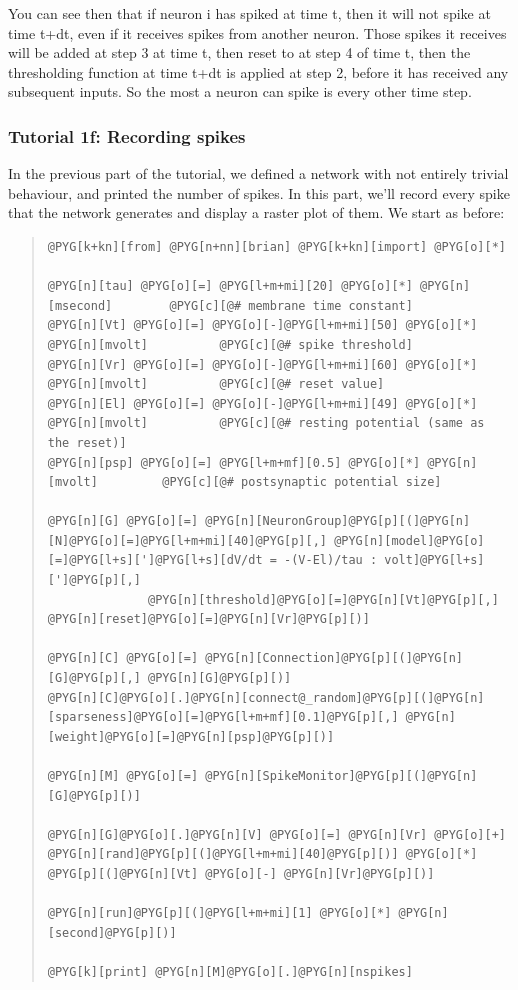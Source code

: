 \documentclass[letterpaper,10pt,english]{manual}
\begin{document}
You can see then that if neuron i has spiked at time t, then it
will not spike at time t+dt, even if it receives spikes from
another neuron. Those spikes it receives will be added at step
3 at time t, then reset to  at step 4 of time t, then the
thresholding function at time t+dt is applied at step 2, before
it has received any subsequent inputs. So the most a neuron
can spike is every other time step.

\resetcurrentobjects
\hypertarget{--doc-tutorial_1f_recording_spikes}{}

\subsubsection{Tutorial 1f: Recording spikes}

In the previous part of the tutorial, we defined a network with
not entirely trivial behaviour, and printed the number of spikes.
In this part, we'll record every spike that the network generates
and display a raster plot of them. We start as before:
\begin{quote}

\begin{Verbatim}[commandchars=@\[\]]
@PYG[k+kn][from] @PYG[n+nn][brian] @PYG[k+kn][import] @PYG[o][*]

@PYG[n][tau] @PYG[o][=] @PYG[l+m+mi][20] @PYG[o][*] @PYG[n][msecond]        @PYG[c][@# membrane time constant]
@PYG[n][Vt] @PYG[o][=] @PYG[o][-]@PYG[l+m+mi][50] @PYG[o][*] @PYG[n][mvolt]          @PYG[c][@# spike threshold]
@PYG[n][Vr] @PYG[o][=] @PYG[o][-]@PYG[l+m+mi][60] @PYG[o][*] @PYG[n][mvolt]          @PYG[c][@# reset value]
@PYG[n][El] @PYG[o][=] @PYG[o][-]@PYG[l+m+mi][49] @PYG[o][*] @PYG[n][mvolt]          @PYG[c][@# resting potential (same as the reset)]
@PYG[n][psp] @PYG[o][=] @PYG[l+m+mf][0.5] @PYG[o][*] @PYG[n][mvolt]         @PYG[c][@# postsynaptic potential size]

@PYG[n][G] @PYG[o][=] @PYG[n][NeuronGroup]@PYG[p][(]@PYG[n][N]@PYG[o][=]@PYG[l+m+mi][40]@PYG[p][,] @PYG[n][model]@PYG[o][=]@PYG[l+s][']@PYG[l+s][dV/dt = -(V-El)/tau : volt]@PYG[l+s][']@PYG[p][,]
              @PYG[n][threshold]@PYG[o][=]@PYG[n][Vt]@PYG[p][,] @PYG[n][reset]@PYG[o][=]@PYG[n][Vr]@PYG[p][)]

@PYG[n][C] @PYG[o][=] @PYG[n][Connection]@PYG[p][(]@PYG[n][G]@PYG[p][,] @PYG[n][G]@PYG[p][)]
@PYG[n][C]@PYG[o][.]@PYG[n][connect@_random]@PYG[p][(]@PYG[n][sparseness]@PYG[o][=]@PYG[l+m+mf][0.1]@PYG[p][,] @PYG[n][weight]@PYG[o][=]@PYG[n][psp]@PYG[p][)]

@PYG[n][M] @PYG[o][=] @PYG[n][SpikeMonitor]@PYG[p][(]@PYG[n][G]@PYG[p][)]

@PYG[n][G]@PYG[o][.]@PYG[n][V] @PYG[o][=] @PYG[n][Vr] @PYG[o][+] @PYG[n][rand]@PYG[p][(]@PYG[l+m+mi][40]@PYG[p][)] @PYG[o][*] @PYG[p][(]@PYG[n][Vt] @PYG[o][-] @PYG[n][Vr]@PYG[p][)]

@PYG[n][run]@PYG[p][(]@PYG[l+m+mi][1] @PYG[o][*] @PYG[n][second]@PYG[p][)]

@PYG[k][print] @PYG[n][M]@PYG[o][.]@PYG[n][nspikes]
\end{Verbatim}
\end{quote}
\end{document}
